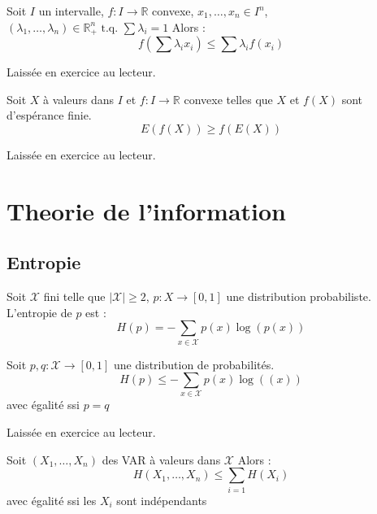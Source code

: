 \begin{theorem}
    Soit \(I \) un intervalle, \(f: I \to  \mathbb{R}\) convexe, \(x_{1}, \dots, x_{n} \in I^{n}\), \((\lambda_{1}, \dots, \lambda_{n}) \in \mathbb{R}^{n}_{+} \text{ t.q. } \sum \lambda _{i} = 1\)  Alors : 
    \[
        f(\sum \lambda_{i} x_{i}) \leq \sum \lambda_{i} f(x_{i})
    \]
\end{theorem}

\begin{explanation}
    Laissée en exercice au lecteur. 
\end{explanation}

\begin{lemma}
    Soit \(X\) à valeurs dans \(I\) et \(f: I \to \mathbb{R}\) convexe telles que \(X\) et \(f(X)\) sont d'espérance finie.
    \[
        E(f(X)) \geq f(E(X))
    \]  
\end{lemma}

\begin{explanation}
    Laissée en exercice au lecteur. 
\end{explanation}

\section{Theorie de l'information}
\subsection{Entropie}

\begin{definition}[Entropie]
    Soit \(\mathcal{X}\) fini telle que \(\lvert \mathcal{X} \rvert \geq 2 \), \(p : X \to  [0,1]\) une distribution probabiliste. L'entropie de \(p\) est : 
    \[
        H(p) = - \sum_{x \in \mathcal{X}} p(x) \log (p(x))
    \]
\end{definition}

\begin{theorem}
    Soit \(p,q : \mathcal{X} \to [0,1]\) une distribution de probabilités.
    \[
        H(p) \leq - \sum_{x \in \mathcal{X}} p(x)\log ((x))
    \] 
    avec égalité ssi \(p = q\) 
\end{theorem}

\begin{explanation}
    Laissée en exercice au lecteur. 
\end{explanation}
\begin{lemma}[Proposition]
    Soit \((X_{1},\dots,X_{n})\) des VAR à valeurs dans \(\mathcal{X}\) Alors : 
    \[
        H(X_{1},\dots,X_{n}) \leq \sum_{i=1} H(X_{i})
    \] 
    avec égalité ssi les \(X_{i}\) sont indépendants 
\end{lemma}

